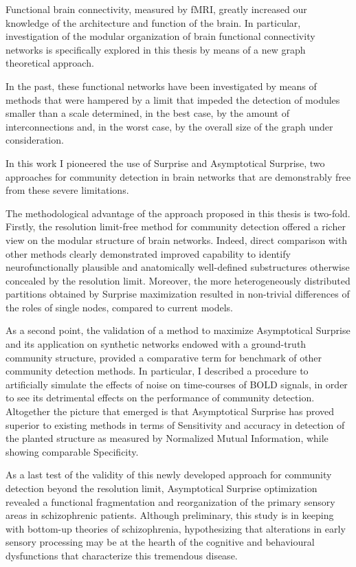 Functional brain connectivity, measured by fMRI, greatly increased our knowledge of the architecture and function of the brain.
In particular, investigation of the modular organization of brain functional connectivity networks is specifically explored in this thesis by means of a new graph theoretical approach.

In the past, these functional networks have been investigated by means of methods that were hampered by a limit that impeded the detection of modules smaller than a scale determined, in the best case, by the amount of interconnections and, in the worst case, by the overall size of the graph under consideration.

In this work I pioneered the use of Surprise and Asymptotical Surprise, two approaches for community detection in brain networks that are demonstrably free from these severe limitations.

The methodological advantage of the approach proposed in this thesis is two-fold.
Firstly, the resolution limit-free method for community detection offered a richer view on the modular structure of brain networks.
Indeed, direct comparison with other methods clearly demonstrated improved capability to identify neurofunctionally plausible and anatomically well-defined substructures otherwise concealed by the resolution limit.
Moreover, the more heterogeneously distributed partitions obtained by Surprise maximization resulted in non-trivial differences of the roles of single nodes, compared to current models.

As a second point, the validation of a method to maximize Asymptotical Surprise and its application on synthetic networks endowed with a ground-truth community structure, provided a comparative term for benchmark of other community detection methods.
In particular, I described a procedure to artificially simulate the effects of noise on time-courses of BOLD signals, in order to see its detrimental effects on the performance of community detection.
Altogether the picture that emerged is that Asymptotical Surprise has proved superior to existing methods in terms of Sensitivity and accuracy in detection of the planted structure as measured by Normalized Mutual Information, while showing comparable Specificity.

As a last test of the validity of this newly developed approach for community detection beyond the resolution limit, Asymptotical Surprise optimization revealed a functional fragmentation and reorganization of the primary sensory areas in schizophrenic patients.
Although preliminary, this study is in keeping with bottom-up theories of schizophrenia, hypothesizing that alterations in early sensory processing may be at the hearth of the cognitive and behavioural dysfunctions that characterize this tremendous disease.

